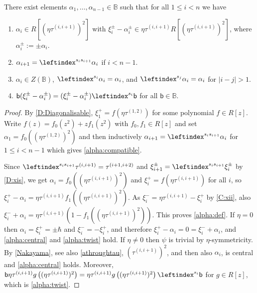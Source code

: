 \documentclass[a4paper,11pt]{amsart}
\numberwithin{equation}{subsection}
\theoremstyle{definition}
\theoremstyle{theorem}
\theoremstyle{remark}
\newcommand\xipm{\xi^\pm}
\newcommand\bb{\mathsf{b}}
\newcommand\taui[1][i]{\tau^{(#1)}}
\newcommand{\Bo}{\mathbb{B}}
\begin{document}
\begin{Lemma}\label{L:alpha}
  There exist elements $\alpha_1,\dots,\alpha_{n-1}\in\Bo$ such that for all $1\le i<n$
  we have
  \begin{enumerate}
    \item\label{alpha:def} $\alpha_i\in R[(\eta\taui[i,i+1])^2]$ with
    $\xipm_i-\alpha^\pm_i\in \eta\taui[i,i+1]R[(\eta\taui[i,i+1])^2]$, where
    $\alpha^\pm_i:=\pm\alpha_i$.
  \item\label{alpha:compatible} $\alpha_{i+1}=\leftindex^{s_is_{i+1}}\alpha_i$ if $i<n-1$.
  \item\label{alpha:central} $\alpha_i\in Z(\Bo)$, $\leftindex^{s_i}\alpha_i=\alpha_i$, and $\leftindex^{s_j}\alpha_i=\alpha_i$ for $|i-j|>1$.
  \item\label{alpha:twist} $\bb(\xipm_i-\alpha^\pm_i)=(\xipm_i-\alpha^\pm_i)\leftindex^{s_i}\bb$ for all $\bb\in\Bo$.
  \end{enumerate}
\end{Lemma}

\begin{proof}
  By \autoref{D:Diagonalisable}, $\xi^+_1=f(\eta\taui[1,2])$ for some polynomial
  $f\in R[z]$. Write $f(z)=f_0(z^2)+zf_1(z^2)$ with $f_0,f_1\in R[z]$ and set
  $\alpha_1=f_0\left((\eta\taui[1,2])^2\right)$ and then inductively
  $\alpha_{i+1}=\leftindex^{s_is_{i+1}}{{\alpha_i}}$ for $1\le i<n-1$ which gives \ref{alpha:compatible}.

  Since
  $\leftindex^{s_is_{i+1}}{{\taui[i,i+1]}}=\taui[i+1,i+2]$ and
  $\xipm_{i+1}=\leftindex^{s_is_{i+1}}{{\xipm_i}}$ by \autoref{D:xis}, we get
  $\alpha_i=f_0\left((\eta\taui[i,i+1])^2\right)$ and
  $\xi^+_i=f(\eta\taui[i,i+1])$ for all $i$, so
  $\xi^+_i-\alpha_i=\eta\taui[i,i+1]f_1\left((\eta\taui[i,i+1])^2\right)$.
  As $\xi^-_i=\eta\taui[i,i+1]-\xi^+_i$ by \autoref{C:xii}, also
  $\xi^-_i+\alpha_i=\eta\taui[i,i+1]\left(1-f_1\left((\eta\taui[i,i+1])^2\right)\right)$.
  This proves \ref{alpha:def}.  If  $\eta=0$ then $\alpha_i=\xi^+_i=\pm\hbar$ and $\xi^-_i=-\xi^+_i$,
  and therefore $\xi^+_i-\alpha_i=0=\xi^-_i+\alpha_i$, and
  \ref{alpha:central} and \ref{alpha:twist} hold. If $\eta\not=0$
  then $\psi$ is trivial by $\eta$-symmetricity. By \autoref{Nakayama}, see also \autoref{athroughtau},
  $(\taui[i,i+1])^2$, and then also $\alpha_i$, is central and \ref{alpha:central}  holds.
  Moreover, $\bb\eta\taui[i,i+1]g\left((\eta\taui[i,i+1])^2\right)=\eta\taui[i,i+1]g\left((\eta\taui[i,i+1])^2\right)\leftindex^{s_i}\bb$
  for $g\in R[z]$, which is \ref{alpha:twist}.
\end{proof}
\end{document}
